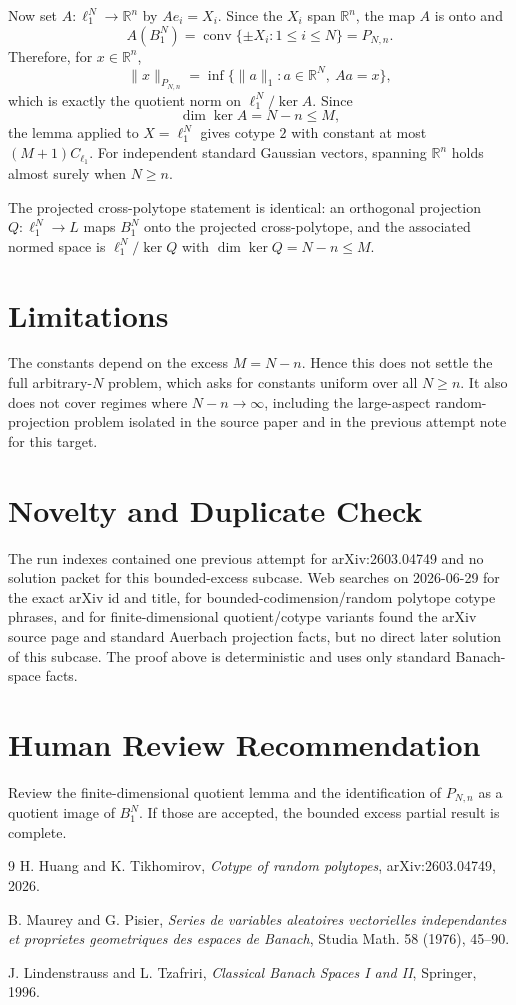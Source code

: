 \documentclass[11pt]{article}
\begin{document}
Now set $A:\ell_1^N\to\mathbb R^n$ by $Ae_i=X_i$.  Since the $X_i$ span
$\mathbb R^n$, the map $A$ is onto and
\[
  A(B_1^N)=\operatorname{conv}\{\pm X_i:1\le i\le N\}=P_{N,n}.
\]
Therefore, for $x\in\mathbb R^n$,
\[
  \|x\|_{P_{N,n}}
  =\inf\{\|a\|_1:a\in\mathbb R^N,\ Aa=x\},
\]
which is exactly the quotient norm on $\ell_1^N/\ker A$.  Since
\[
  \dim \ker A=N-n\le M,
\]
the lemma applied to $X=\ell_1^N$ gives cotype $2$ with constant at most
$(M+1)C_{\ell_1}$.  For independent standard Gaussian vectors, spanning
$\mathbb R^n$ holds almost surely when $N\ge n$.

The projected cross-polytope statement is identical: an orthogonal projection
$Q:\ell_1^N\to L$ maps $B_1^N$ onto the projected cross-polytope, and the
associated normed space is $\ell_1^N/\ker Q$ with
$\dim\ker Q=N-n\le M$.

\section*{Limitations}

The constants depend on the excess $M=N-n$.  Hence this does not settle the
full arbitrary-$N$ problem, which asks for constants uniform over all
$N\ge n$.  It also does not cover regimes where $N-n\to\infty$, including the
large-aspect random-projection problem isolated in the source paper and in the
previous attempt note for this target.

\section*{Novelty and Duplicate Check}

The run indexes contained one previous attempt for arXiv:2603.04749 and no
solution packet for this bounded-excess subcase.  Web searches on
2026-06-29 for the exact arXiv id and title, for bounded-codimension/random
polytope cotype phrases, and for finite-dimensional quotient/cotype variants
found the arXiv source page and standard Auerbach projection facts, but no
direct later solution of this subcase.  The proof above is deterministic and
uses only standard Banach-space facts.

\section*{Human Review Recommendation}

Review the finite-dimensional quotient lemma and the identification of
$P_{N,n}$ as a quotient image of $B_1^N$.  If those are accepted, the bounded
excess partial result is complete.

\begin{thebibliography}{9}
H. Huang and K. Tikhomirov,
\emph{Cotype of random polytopes},
arXiv:2603.04749, 2026.

B. Maurey and G. Pisier,
\emph{Series de variables aleatoires vectorielles independantes et proprietes
geometriques des espaces de Banach},
Studia Math. 58 (1976), 45--90.

J. Lindenstrauss and L. Tzafriri,
\emph{Classical Banach Spaces I and II},
Springer, 1996.
\end{thebibliography}
\end{document}
